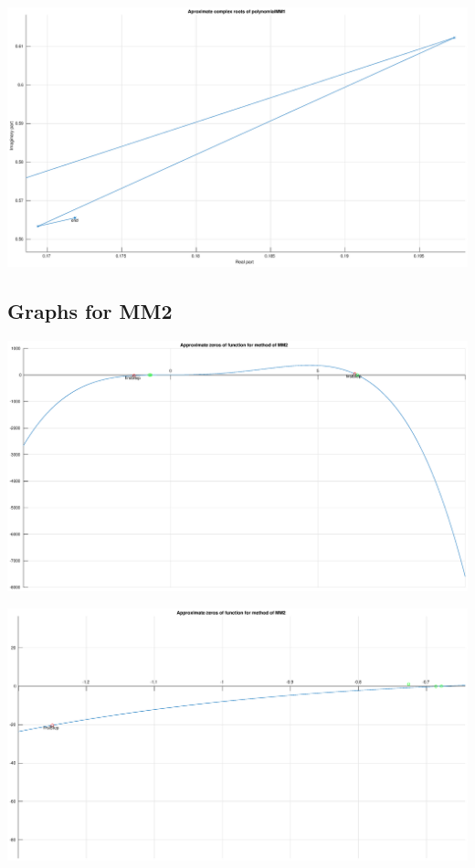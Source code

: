 \documentclass[12pt]{report}
\begin{document}
\begin{center}
   \includegraphics[scale=0.25]{task2mm1complexup.eps}
\end{center}

\subsection{Graphs for MM2}
\begin{center}
   \includegraphics[scale=0.25]{task2mm2realoverall.eps}
\end{center}

\begin{center}
   \includegraphics[scale=0.25]{task2mm2realleft.eps}
\end{center}
\end{document}
